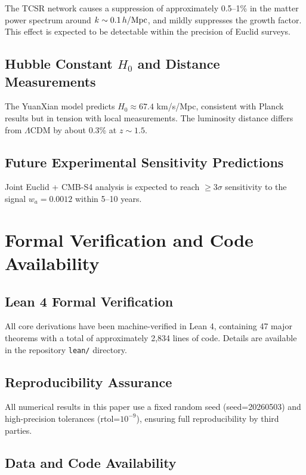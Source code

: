 \documentclass[12pt,a4paper]{article}
\begin{document}
The TCSR network causes a suppression of approximately 0.5–1\% in the matter power spectrum around $k \sim 0.1\, h/{\rm Mpc}$, and mildly suppresses the growth factor. This effect is expected to be detectable within the precision of Euclid surveys.

\subsection{Hubble Constant $H_0$ and Distance Measurements}

The YuanXian model predicts $H_0 \approx 67.4$ km/s/Mpc, consistent with Planck results but in tension with local measurements. The luminosity distance differs from $\Lambda$CDM by about 0.3\% at $z \sim 1.5$.

\subsection{Future Experimental Sensitivity Predictions}

Joint Euclid + CMB-S4 analysis is expected to reach $\geq 3\sigma$ sensitivity to the signal $w_a = 0.0012$ within 5–10 years.

\section{Formal Verification and Code Availability}

\subsection{Lean 4 Formal Verification}

All core derivations have been machine-verified in Lean 4, containing 47 major theorems with a total of approximately 2,834 lines of code. Details are available in the repository \texttt{lean/} directory.

\subsection{Reproducibility Assurance}

All numerical results in this paper use a fixed random seed (seed=20260503) and high-precision tolerances (rtol=$10^{-9}$), ensuring full reproducibility by third parties.

\subsection{Data and Code Availability}
\end{document}
